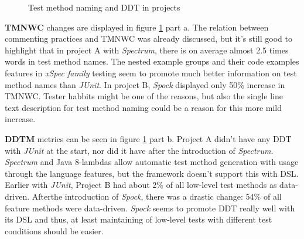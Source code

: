     \begin{figure}[H]%
        \centering
        \qquad
        \caption{Test method naming and DDT in projects}%
        \label{fig:tmnwc-ddtm}%
    \end{figure}

\textbf{TMNWC} changes are displayed in figure \ref{fig:tmnwc-ddtm} part a. The relation between commenting practices
and TMNWC was already discussed, but it's still good to highlight that in project A with \textit{Spectrum}, there is on average
almost 2.5 times words in test method names. The nested example groups and their code examples features in \textit{xSpec family} testing
seem to promote much better information on test method names than \textit{JUnit}. In project B, \textit{Spock} displayed only 50\% increase in TMNWC.
Tester habbits might be one of the reasons, but also the single line text description for test method naming could be a
reason for this more mild increase.

\textbf{DDTM} metrics can be seen in figure \ref{fig:tmnwc-ddtm} part b. Project A didn't have any DDT with \textit{JUnit} at the start,
nor did it have after the introduction of \textit{Spectrum}. \textit{Spectrum} and Java 8-lambdas allow automatic test method generation with
usage through the language features, but the framework doesn't support this with DSL. Earlier with \textit{JUnit}, Project B had about 2\% of
all low-level test methods as data-driven. After\restoregeometry \noindent the introduction of \textit{Spock}, there was a drastic change:
 54\% of all
feature methods were data-driven.
\textit{Spock} seems to promote DDT really well with its DSL and thus, at least maintaining of low-level tests with different
test conditions should be easier.

